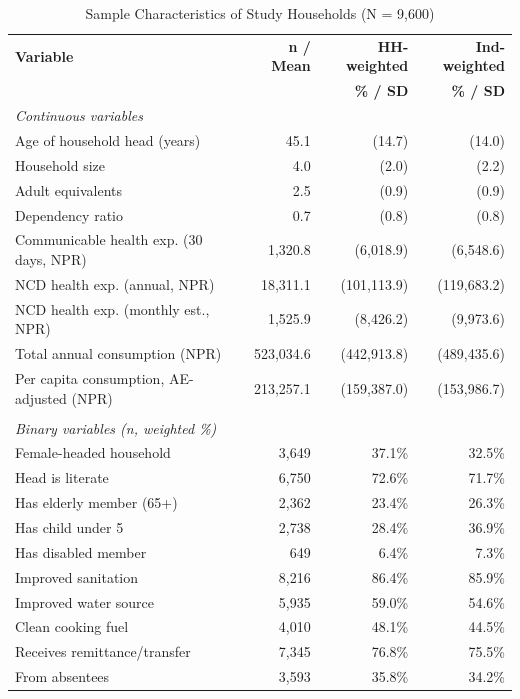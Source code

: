 \begin{table}[htbp]
\centering
\caption{Sample Characteristics of Study Households (N = 9,600)}
\label{tab:descriptive}
\small
\begin{tabular}{lrrr}
\hline\hline
\textbf{Variable} & \textbf{n / Mean} & \textbf{HH-weighted} & \textbf{Ind-weighted} \\
 & & \textbf{\% / SD} & \textbf{\% / SD} \\
\hline
\multicolumn{4}{l}{\textit{Continuous variables}} \\
\quad Age of household head (years) & 45.1 & (14.7) & (14.0) \\
\quad Household size & 4.0 & (2.0) & (2.2) \\
\quad Adult equivalents & 2.5 & (0.9) & (0.9) \\
\quad Dependency ratio & 0.7 & (0.8) & (0.8) \\
\quad Communicable health exp. (30 days, NPR) & 1,320.8 & (6,018.9) & (6,548.6) \\
\quad NCD health exp. (annual, NPR) & 18,311.1 & (101,113.9) & (119,683.2) \\
\quad NCD health exp. (monthly est., NPR) & 1,525.9 & (8,426.2) & (9,973.6) \\
\quad Total annual consumption (NPR) & 523,034.6 & (442,913.8) & (489,435.6) \\
\quad Per capita consumption, AE-adjusted (NPR) & 213,257.1 & (159,387.0) & (153,986.7) \\
\\
\multicolumn{4}{l}{\textit{Binary variables (n, weighted \%)}} \\
\quad Female-headed household & 3,649 & 37.1\% & 32.5\% \\
\quad Head is literate & 6,750 & 72.6\% & 71.7\% \\
\quad Has elderly member (65+) & 2,362 & 23.4\% & 26.3\% \\
\quad Has child under 5 & 2,738 & 28.4\% & 36.9\% \\
\quad Has disabled member & 649 & 6.4\% & 7.3\% \\
\quad Improved sanitation & 8,216 & 86.4\% & 85.9\% \\
\quad Improved water source & 5,935 & 59.0\% & 54.6\% \\
\quad Clean cooking fuel & 4,010 & 48.1\% & 44.5\% \\
\quad Receives remittance/transfer & 7,345 & 76.8\% & 75.5\% \\
\quad \quad From absentees & 3,593 & 35.8\% & 34.2\% \\

\end{tabular}
\end{table}
